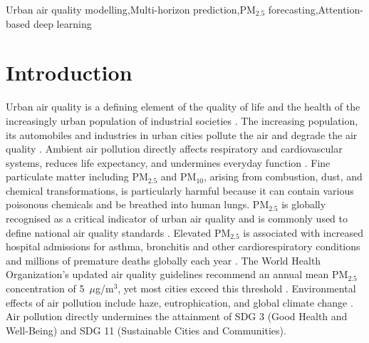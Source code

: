 \documentclass[a4paper,fleqn]{cas-sc}
\begin{document}
\begin{keywords}
Urban air quality modelling\sep Multi-horizon prediction\sep PM$_{2.5}$ forecasting\sep Attention-based deep learning
\end{keywords}


\maketitle

\section{Introduction} \label{sec1}

Urban air quality is a defining element of the quality of life and the health of the increasingly urban population of industrial societies \cite{volgyesi2008air}. The increasing population, its automobiles and industries in urban cities pollute the air and degrade the air quality \cite{kang2018air}. Ambient air pollution directly affects respiratory and cardiovascular systems, reduces life expectancy, and undermines everyday function \cite{jia2023effect,zhang2023air}. Fine particulate matter including PM$_{2.5}$ and PM$_{10}$, arising from combustion, dust, and chemical transformations, is particularly harmful because it can contain various poisonous chemicals and be breathed into human lungs. PM$_{2.5}$ is globally recognised as a critical indicator of urban air quality and is commonly used to define national air quality standards \cite{hodoli2024urban}. Elevated PM$_{2.5}$ is associated with increased hospital admissions for asthma, bronchitis and other cardiorespiratory conditions and millions of premature deaths globally each year \cite{lelieveld2019effects,world2021global}. The World Health Organization’s updated air quality guidelines recommend an annual mean PM$_{2.5}$ concentration of 5~$\mu$g/m$^3$, yet most cities exceed this threshold \cite{pai2022updated}. Environmental effects of air pollution include haze, eutrophication, and global climate change \cite{kang2018air}. Air pollution directly undermines the attainment of SDG 3 (Good Health and Well-Being) and SDG 11 (Sustainable Cities and Communities). 
\end{document}
